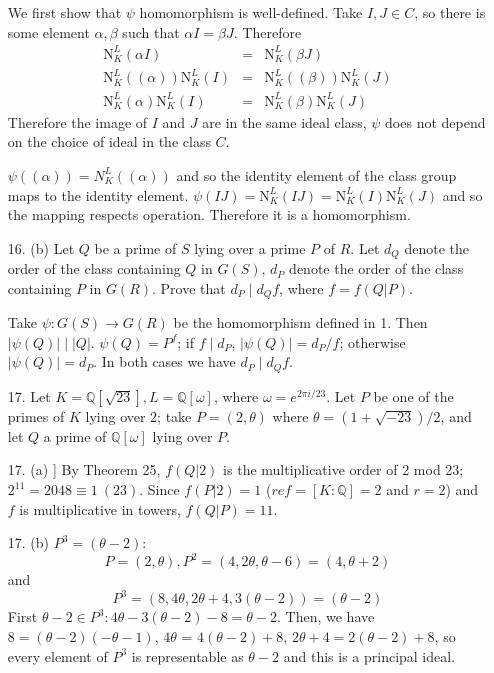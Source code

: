 \documentclass{article}
\newcommand{\w}[0]{\omega}
\newcommand{\Q}[0]{\mathbb{Q}}
\newcommand{\norm}[0]{\text{N}}
\newcommand{\modequiv}[3]{#1 \equiv #2\ (#3)}
\begin{document}
\begin{enumerate}
We first show that $\psi$ homomorphism is well-defined.  Take $I, J \in C$, so there is some element $\alpha, \beta$ such that $\alpha I = \beta J$.  Therefore \begin{eqnarray*}
    \norm^{L}_{K}(\alpha I) &=& \norm^{L}_{K}(\beta J) \\
    \norm^{L}_{K}((\alpha))\norm^{L}_{K}(I) &=& \norm^{L}_{K}((\beta))\norm^{L}_{K}(J) \\
    \norm^{L}_{K}(\alpha)\norm^{L}_{K}(I) &=& \norm^{L}_{K}(\beta)\norm^{L}_{K}(J)
\end{eqnarray*}
Therefore the image of $I$ and $J$ are in the same ideal class, $\psi$ does not depend on the choice of ideal in the class $C$.

$\psi((\alpha)) = N^{L}_{K}((\alpha))$ and so the identity element of the class group maps to the identity element.  $\psi(IJ) = \norm^{L}_{K}(IJ) = \norm^{L}_{K}(I)\norm^{L}_{K}(J)$ and so the mapping respects operation.  Therefore it is a homomorphism.

\item[16. (b)] Let $Q$ be a prime of $S$ lying over a prime $P$ of $R$.  Let $d_{Q}$ denote the order of the class containing $Q$ in $G(S)$, $d_{P}$ denote the order of the class containing $P$ in $G(R)$.  Prove that $d_{P} \mid d_{Q} f$, where $f = f(Q|P)$.

Take $\psi : G(S) \to G(R)$ be the homomorphism defined in 1.  Then $|\psi(Q)| \mid |Q|$. $\psi(Q) = P^{f}$; if $f \mid d_{P}$, $|\psi(Q)| = d_{P} / f$; otherwise $|\psi(Q)| = d_{P}$.  In both cases we have $d_{P} \mid d_{Q} f$.

\item[17.] Let $K = \Q[\sqrt{23}], L = \Q[\w]$, where $\w = e^{2\pi i /23}$.  Let $P$ be one of the primes of $K$ lying over 2; take $P = (2, \theta)$ where $\theta = (1 + \sqrt{-23})/2$, and let $Q$ a prime of $\Q[\w]$ lying over $P$.

\item[17. (a)]] By Theorem 25, $f(Q|2)$ is the multiplicative order of 2 mod 23; $2^{11} = \modequiv{2048}{1}{23}$.  Since $f(P|2) = 1$ ($ref = [K : \Q] = 2$ and $r = 2$) and $f$ is multiplicative in towers, $f(Q|P) = 11$.
\item[17. (b)] $P^3 = (\theta - 2)$: \[ P = (2, \theta), P^2 = (4, 2\theta, \theta - 6) = (4, \theta + 2) \] and \[ P^3 = (8, 4\theta, 2\theta + 4, 3(\theta - 2)) = (\theta - 2) \]  First $\theta - 2 \in P^3: 4\theta - 3(\theta - 2) - 8 = \theta - 2$.  Then, we have $8 = (\theta - 2)(-\theta - 1)$, $4\theta$ = $4(\theta - 2) + 8$, $2\theta + 4 = 2(\theta - 2) + 8$, so every element of $P^3$ is representable as $\theta - 2$ and this is a principal ideal.


\end{enumerate}
\end{document}
